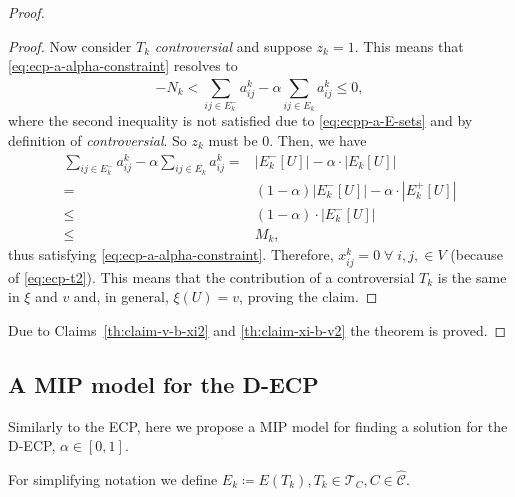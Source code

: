 \begin{proof}
\begin{proof}
		Now consider $T_k$ \emph{controversial} and suppose $z_k = 1$. This means that
		\eqref{eq:ecp-a-alpha-constraint} resolves to
		\begin{equation*}
			-N_k < \sum^{}_{ij \in E^-_k} a_{ij}^{k}  - \alpha \sum^{}_{ij
				\in E_k}
			a_{ij} ^{k} \leq 0,
		\end{equation*}
		where the second inequality is not satisfied due to \eqref{eq:ecpp-a-E-sets} and by
		definition of \emph{controversial}. So $z_k$ must be $0$.
		Then, we have
		\begin{align*}
			\sum^{}_{ij \in E^-_k} a_{ij}^{k}  - \alpha \sum^{}_{ij
				\in E_k}
			a_{ij} ^{k} = & |E^{-}_{k}[U]| - \alpha \cdot |E_{k}[U]|                \\
			=             & (1- \alpha)|E^{-}_{k}[U]| - \alpha \cdot |E^{+}_{k}[U]| \\
			\leq          & (1- \alpha )\cdot |E^{-}_{k}[U]|                        \\
			\leq          & M_k,
		\end{align*}
		thus satisfying \eqref{eq:ecp-a-alpha-constraint}. Therefore, $x_{ij}^{k} = 0 \; \forall \;i, j, \in V$ (because of
		\eqref{eq:ecp-t2}).
		This means that the contribution of a controversial $T_k$ is the same in $\xi$ and $v$ and,
		in general, $\xi(U) = v$, proving the claim.
	\end{proof}

	Due to Claims~\ref{th:claim-v-b-xi2} and \ref{th:claim-xi-b-v2} the theorem
	is proved.
\end{proof}

\subsection{A MIP model for the \acrshort{D-ECP}}%
\label{sub:a_mip_model_for_the_d_ecp}

Similarly to the \acrshort{ECP}, here we propose a \acrshort{MIP} model for
finding a solution for the \acrshort{D-ECP}, $\alpha \in [0, 1]$.

For simplifying notation we define $E_{k} \coloneqq E(T_{k}), T_{k} \in
	\mathcal{T}_{C}, C \in \mathcal{\hat{C}}$.

